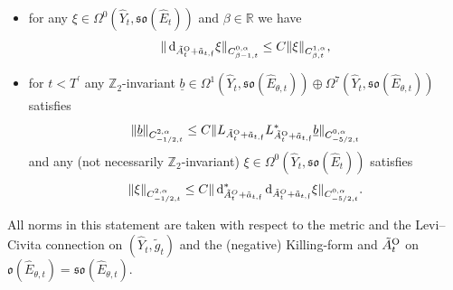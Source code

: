 \documentclass[11pt,a4paper]{scrartcl}
\newcommand*\diff{\mathop{}\!\textup{d}}
\newcommand{\VertWHt}[3]{\Vert_{C^{{#1},\alpha}_{{#2},t}{#3}}}
\renewcommand{\O}{\textup{O}}
\numberwithin{equation}{section}
\theoremstyle{plain}
\theoremstyle{definition}
\theoremstyle{remark}
\begin{document}
\begin{proposition}
\begin{enumerate}
\begin{itemize}
\begin{align*}
\end{align*} 
where $\partial_\mathfrak{F}^\ell L_{\tilde{A}_t^\O + \tilde{a}_{t,\mathfrak{f}}}$ (and similarly $\partial_\mathfrak{F}^\ell L_{\tilde{A}_t^\O + \tilde{a}_{t,\mathfrak{f}}}^*$) denotes the $\ell$-th derivative of the function $\mathfrak{f} \mapsto  L_{\tilde{A}_t^\O + \tilde{a}_{t,\mathfrak{f}}} \in \textup{Lin}(C^{1,\alpha}_{\beta,t},C^{0,\alpha}_{\beta-1,t})$,
\item for any $\xi \in \Omega^0(\hat{Y}_t,\mathfrak{so}(\hat{E}_t))$ and $\beta \in \mathbb{R}$ we have \[ \Vert \diff_{\tilde{A}_t^\O + \tilde{a}_{t,\mathfrak{f}}} \xi \VertWHt{0}{\beta-1}{} \leq C \Vert \xi \VertWHt{1}{\beta}{},\]
\item for $t<T^\prime$ any $\mathbb{Z}_2$-invariant $\underline{b}\in \Omega^1(\hat{Y}_t,\mathfrak{so}(\hat{E}_{\theta,t}))\oplus \Omega^7(\hat{Y}_t,\mathfrak{so}(\hat{E}_{\theta,t}))$ satisfies \[ \Vert \underline{b} \VertWHt{2}{-1/2}{} \leq C \Vert L_{\tilde{A}_{t}^{\O}+\tilde{a}_{t,\mathfrak{f}}}L_{\tilde{A}_{t}^{\O}+\tilde{a}_{t,\mathfrak{f}}}^* \underline{b} \VertWHt{0}{-5/2}{}\] and any (not necessarily $\mathbb{Z}_2$-invariant) $\xi \in \Omega^0(\hat{Y}_t,\mathfrak{so}(\hat{E}_t))$ satisfies \[\Vert \xi \VertWHt{2}{-1/2}{} \leq C \Vert \diff_{\tilde{A}^O_{t}+\tilde{a}_{t,\mathfrak{f}}}^*\diff_{\tilde{A}^O_{t}+\tilde{a}_{t,\mathfrak{f}}} \xi \VertWHt{0}{-5/2}{}.\] 
\end{itemize}
\end{enumerate}
All norms in this statement are taken with respect to the metric and the Levi--Civita connection on $(\hat{Y}_t,\tilde{g}_t)$ and the (negative) Killing-form and $\tilde{A}_{t}^{\O}$ on $\mathfrak{o}(\hat{E}_{\theta,t})=\mathfrak{so}(\hat{E}_{\theta,t})$.
\end{proposition}
\end{document}
